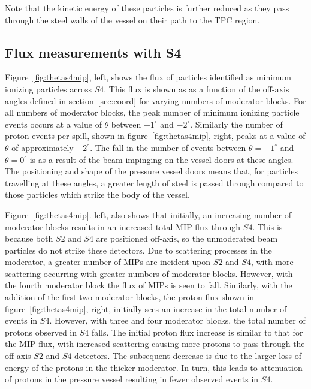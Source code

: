 Note that the kinetic energy of these particles is further reduced as they pass through the steel walls of the vessel on their path to the TPC region.

\subsection{Flux measurements with S4}

Figure~\ref{fig:thetas4mip}, left, shows the flux of particles identified as minimum ionizing particles across $\mathit{S4}$.
This flux is shown as as a function of the off-axis angles defined in section~\ref{sec:coord} for varying numbers of moderator blocks.
For all numbers of moderator blocks, the peak number of minimum ionizing particle events occurs at a value of $\theta$ between $-1^{\circ}$ and $-2^{\circ}$.
Similarly the number of proton events per spill, shown in figure~\ref{fig:thetas4mip}, right, peaks at a value of $\theta$ of approximately $-2^{\circ}$.
The fall in the number of events between $\theta = -1^{\circ}$ and $\theta = 0^{\circ}$ is as a result of the beam impinging on the vessel doors at these angles.
The positioning and shape of the pressure vessel doors means that, for particles travelling at these angles, a greater length of steel is passed through compared to those particles which strike the body of the vessel.


Figure~\ref{fig:thetas4mip}. left, also shows that initially, an increasing number of moderator blocks results in an increased total MIP flux through $\mathit{S4}$. 
This is because both $\mathit{S2}$ and $\mathit{S4}$ are positioned off-axis, so the unmoderated beam particles do not strike these detectors.
Due to scattering processes in the moderator, a greater number of MIPs are incident upon $\mathit{S2}$ and $\mathit{S4}$, with more scattering occurring with greater numbers of moderator blocks.
However, with the fourth moderator block the flux of MIPs is seen to fall.
Similarly, with the addition of the first two moderator blocks, the proton flux shown in figure~\ref{fig:thetas4mip}, right, initially sees an increase in the total number of events in $\mathit{S4}$.
However, with three and four moderator blocks, the total number of protons observed in $\mathit{S4}$ falls.
The initial proton flux increase is similar to that for the MIP flux, with increased scattering causing more protons to pass through the off-axis $\mathit{S2}$ and $\mathit{S4}$ detectors.
The subsequent decrease is due to the larger loss of energy of the protons in the thicker moderator.
In turn, this leads to attenuation of protons in the pressure vessel resulting in fewer observed events in $\mathit{S4}$.

